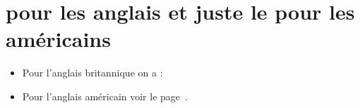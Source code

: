 \newpage

\section{  pour les anglais et juste le pour les
  américains}\label{sec:omegaenvenenv}

\begin{itemize}
\item Pour l'anglais britannique on a :
\item Pour l'anglais américain voir le  page~\pageref{chap:omega}.
\end{itemize}

